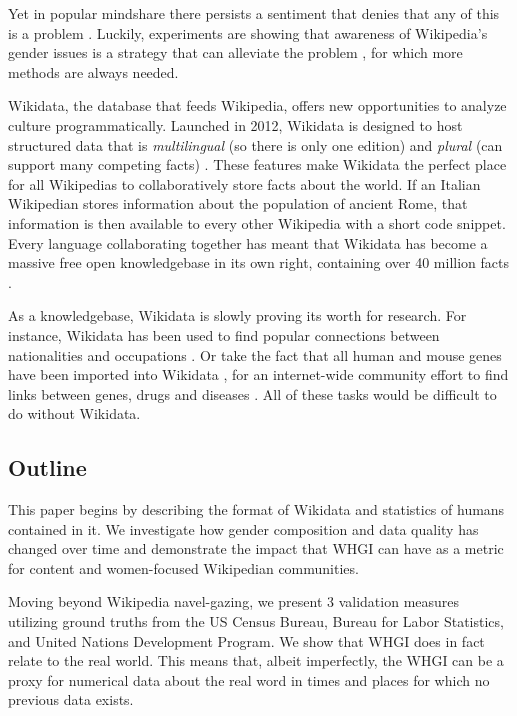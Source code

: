 \documentclass{sig-alternate-05-2015}
\begin{document}
Yet in popular mindshare there persists a sentiment that denies that any of this is a problem \cite{eckert_retriggering_2013}. Luckily, experiments are showing that awareness of Wikipedia's gender issues is a strategy that can alleviate the problem \cite{hinnosaar_gender_2015}, for which more methods are always needed.

Wikidata, the database that feeds Wikipedia, offers new opportunities to analyze culture programmatically. Launched in 2012, Wikidata is designed to host structured data that is \textit{multilingual} (so there is only one edition) and \textit{plural} (can support many competing facts) \cite{vrandecic_wikidata:_2014}.  These features make Wikidata the perfect place for all Wikipedias to collaboratively store facts about the world. If an Italian Wikipedian stores information about the population of ancient Rome, that information is then available to every other Wikipedia with a short code snippet. Every language collaborating together has meant that Wikidata has become a massive free open knowledgebase in its own right, containing over 40 million facts \cite{krotzsch_how_????}.

As a knowledgebase, Wikidata is slowly proving its worth for research. For instance, Wikidata has been used to find popular connections between nationalities and occupations \cite{goldfarb_quantifying_2015}. Or take the fact that all human and mouse genes have been imported into Wikidata \cite{mitraka_wikidata:_2015}, for an internet-wide community effort to find links between genes, drugs and diseases \cite{burgstaller-muehlbacher_wikidata_2015}. All of these tasks would be difficult to do without Wikidata.

\subsection{Outline}

This paper begins by describing the format of Wikidata and statistics of humans contained in it. We investigate how gender composition and data quality has changed over time and demonstrate the impact that WHGI can have as a metric for content and women-focused Wikipedian communities.

Moving beyond Wikipedia navel-gazing, we present 3 validation measures utilizing ground truths from the US Census Bureau, Bureau for Labor Statistics, and United Nations Development Program. We show that WHGI does in fact relate to the real world. This means that, albeit imperfectly, the WHGI can be a proxy for numerical data about the real word in times and places for which no previous data exists.
\end{document}
